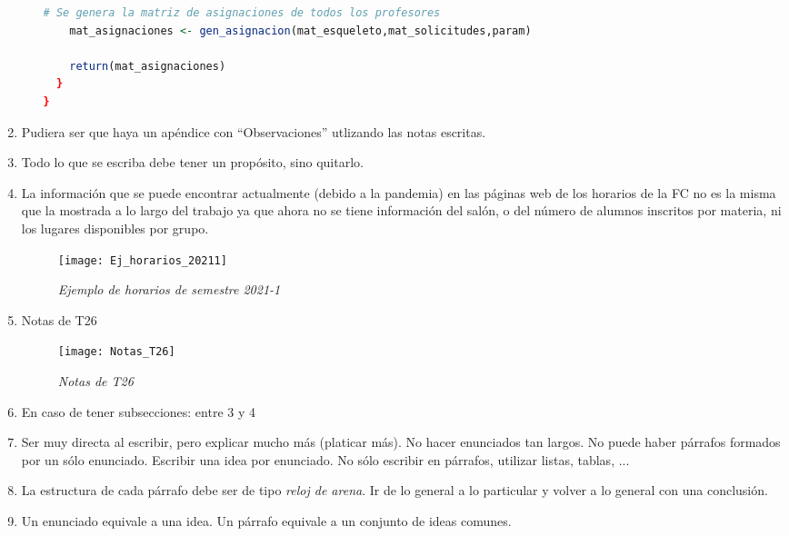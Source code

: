 \begin{appendices}
\begin{enumerate}
\begin{itemize}
\begin{lstlisting}[language=R, caption= \textit{Ejemplo de estructura de funciones}]
    # Se genera la matriz de asignaciones de todos los profesores
    mat_asignaciones <- gen_asignacion(mat_esqueleto,mat_solicitudes,param)
    
    return(mat_asignaciones)
  }
}
  \end{lstlisting}
  \end{itemize}
  
  \item Pudiera ser que haya un apéndice con ``Observaciones'' utlizando las notas escritas.
  
  \item Todo lo que se escriba debe tener un propósito, sino quitarlo.
  
  \item La información que se puede encontrar actualmente (debido a la pandemia) en las páginas web de los horarios de la FC no es la misma que la mostrada a lo largo del trabajo ya que ahora no se tiene información del salón, o del número de alumnos inscritos por materia, ni los lugares disponibles por grupo.
  
\begin{figure}[H]
\centering
\texttt{[image: Ej\_horarios\_20211]} %
\caption{\textit{Ejemplo de horarios de semestre 2021-1}}
\end{figure}
  
  \item Notas de T26
\begin{figure}[H]
\centering
\texttt{[image: Notas\_T26]} %
\caption{\textit{Notas de T26}}
\end{figure}
  
  \item En caso de tener subsecciones: entre 3 y 4
  
  \item Ser muy directa al escribir, pero explicar mucho más (platicar más). No hacer enunciados tan largos. No puede haber párrafos formados por un sólo enunciado. Escribir una idea por enunciado. No sólo escribir en párrafos, utilizar listas, tablas, ...  
  
  \item La estructura de cada párrafo debe ser de tipo \textit{reloj de arena}. Ir de lo general a lo particular y volver a lo general con una conclusión.
  
  \item Un enunciado equivale a una idea. Un párrafo equivale a un conjunto de ideas comunes.
  

\end{enumerate}
\end{appendices}
